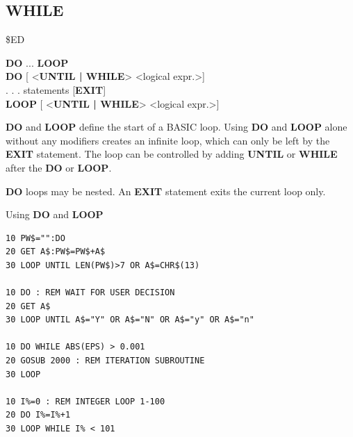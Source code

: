 \subsection{WHILE}
\begin{description}[leftmargin=2cm,style=nextline]
\item [Token:] \$ED
\item [Format:] {\bf DO} ... {\bf LOOP} \\
                {\bf DO} [ <{\bf UNTIL | WHILE}> <logical expr.>] \\
                . . . statements [{\bf EXIT}] \\
                {\bf LOOP} [ <{\bf UNTIL | WHILE}> <logical expr.>]
\item [Usage:] {\bf DO} and {\bf LOOP} define
                the start of a BASIC loop.
                Using {\bf DO} and {\bf LOOP} alone without any
                modifiers creates an infinite loop, which can only be left
                by the {\bf EXIT} statement. The loop can be
                controlled by adding {\bf UNTIL} or {\bf WHILE}
                after the {\bf DO} or {\bf LOOP}.

\item [Remarks:] {\bf DO} loops may be nested. An {\bf EXIT} statement
               exits the current loop only.
\item [Example:] Using {\bf DO} and {\bf LOOP}
\begin{tcolorbox}[colback=black,coltext=white]
\verbatimfont{\codefont}
\begin{verbatim}
10 PW$="":DO
20 GET A$:PW$=PW$+A$
30 LOOP UNTIL LEN(PW$)>7 OR A$=CHR$(13)

10 DO : REM WAIT FOR USER DECISION
20 GET A$
30 LOOP UNTIL A$="Y" OR A$="N" OR A$="y" OR A$="n"

10 DO WHILE ABS(EPS) > 0.001
20 GOSUB 2000 : REM ITERATION SUBROUTINE
30 LOOP

10 I%=0 : REM INTEGER LOOP 1-100
20 DO I%=I%+1
30 LOOP WHILE I% < 101
\end{verbatim}
\end{tcolorbox}
\end{description}


\newpage
